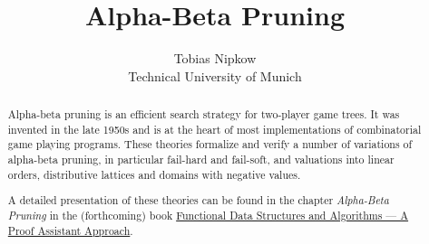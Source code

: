 \documentclass[11pt,a4paper]{report}
\begin{document}
\title{Alpha-Beta Pruning}
\author{Tobias Nipkow\\Technical University of Munich}
\maketitle

\begin{abstract}
Alpha-beta pruning is an efficient search strategy for two-player game trees.
It was invented in the late 1950s and is at the heart of most implementations
of combinatorial game playing programs. These theories formalize and verify a number of
variations of alpha-beta pruning, in particular fail-hard and fail-soft,
and valuations into linear orders, distributive lattices and domains with negative values.

A detailed presentation of these theories can be found in the chapter \emph{Alpha-Beta Pruning}
in the (forthcoming) book
\href{https://functional-algorithms-verified.org/functional_data_structures_algorithms.pdf}{Functional Data Structures and Algorithms --- A Proof Assistant Approach}.
\end{abstract}

{\renewcommand{\isanewline}{\\}

}


\newpage
\tableofcontents
\newpage



\end{document}
